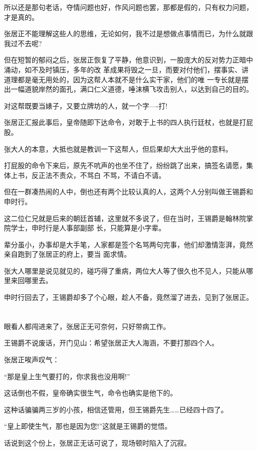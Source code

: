 \documentclass[11pt,a4paper,onecolumn]{article}
\begin{document}
所以还是那句老话，夺情问题也好，作风问题也罢，那都是假的，只有权力问题，才是真的。

张居正不能理解这些人的思维，无论如何，我不过是想做点事情而已，为什么就跟我过不去呢?

但在短暂的郁闷之后，张居正恢复了平静，他意识到，一股庞大的反对势力正暗中涌动，如不及时镇压，多年的改
革成果将毁之一旦，而要对付他们，摆事实、讲道理都是毫无用处的，因为这帮人本就不是什么实干家，他们的唯
一专长就是摆出一幅道貌岸然的面孔，满口仁义道德，唾沫横飞攻击别人，以达到自己的目的。

对这帮既要当婊子，又要立牌坊的人，就一个字----打!

张居正汇报此事后，皇帝随即下达命令，对敢于上书的四人执行廷杖，也就是打屁股。

张大人的本意，大抵也就是教训一下这帮人，但后果却大大出乎他的意料。

打屁股的命令下来后，原先不吭声的也坐不住了，纷纷跳了出来，搞签名请愿，集体上书，反正法不责众，不骂白
不骂，不请白不请。

但在一群凑热闹的人中，倒也还有两个比较认真的人，这两个人分别叫做王锡爵和申时行。

这二位仁兄就是后来的朝廷首辅，这里就不多说了，但在当时，王锡爵是翰林院掌院学士，申时行是人事部副部
长，只能算是小字辈。

辈分虽小，办事却是大手笔，人家都是签个名骂两句完事，他们却激情澎湃，竟然亲自跑到了张居正的府上，要当
面求情。

张大人哪里是说见就见的，碰巧得了重病，两位大人等了很久也不见人，只能从哪里来回哪里去。

申时行回去了，王锡爵却多了个心眼，趁人不备，竟然溜了进去，见到了张居正。

\section[\thesection]{}

眼看人都闯进来了，张居正无可奈何，只好带病工作。

王锡爵不说废话，开门见山：希望张居正大人海涵，不要打那四个人。

张居正唉声叹气：

``那是皇上生气要打的，你求我也没用啊!''

这话倒也不假，皇帝确实很生气，命令也确实是他下的。

这种话骗骗两三岁的小孩，相信还管用，但王锡爵先生……已经四十四了。

``皇上即使生气，那也是因为您!''这就是王锡爵的觉悟。

话说到这个份上，张居正无话可说了，现场顿时陷入了沉寂。
\end{document}
